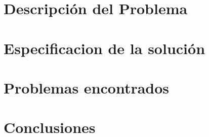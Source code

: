 \documentclass[10pt,a4paper]{article}
\begin{document}
\section{Descripción del Problema}
 

\section{Especificacion de la solución}
	 
\section{Problemas encontrados}
\section{Conclusiones}
\end{document}
